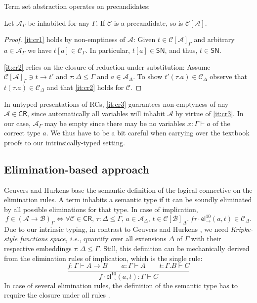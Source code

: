 \documentclass[a4paper,USenglish,cleveref, autoref, thm-restate]{lipics-v2019}
\newcommand{\ie}{\emph{i.e.}\xspace}
\newcommand{\ru}{\dfrac}
\newcommand{\tel}{\mathsf{el}}
\newcommand{\el}[2]{\ensuremath{\tel_{#1}^{#2}}}
\newcommand{\red}[1][]{\longrightarrow_{#1}}
\newcommand{\CR}{\mathsf{CR}}
\newcommand{\A}{\mathcal{A}}
\newcommand{\B}{\mathcal{B}}
\newcommand{\C}{\mathcal{C}}
\newcommand{\SN}{\mathsf{SN}}
\begin{document}
Term set abstraction operates on precandidates:
\begin{lemma}[Abstraction]
\label{lem:abs}
  Let $\A_\Gamma$ be inhabited for any $\Gamma$.
  If $\C$ is a precandidate, so is $\C[\A]$.
\end{lemma}
\begin{proof}
  \ref{it:cr1} holds by non-emptiness of $\A$:
  Given $t \in \C[\A]_\Gamma$ and
  arbitrary $a \in \A_\Gamma$ we have $t[a] \in \C_\Gamma$.  In
  particular, $t[a] \in \SN$, and thus, $t \in \SN$.

  \ref{it:cr2} relies on the closure of reduction
  under substitution:  Assume $\C[\A]_\Gamma \ni t \red t'$ and $\tau
  : \Delta \leq \Gamma$ and $a \in \A_\Delta$.  To show $t'(\tau.a)
  \in \C_\Delta$ observe that $t(\tau.a) \in \C_\Delta$ and that \ref{it:cr2}
  holds for $\C$.
\end{proof}

\begin{remark}
  In untyped presentations of RCs, \ref{it:cr3} guarantees
  non-emptyness of any $\A \in \CR$, since automatically all variables
  will inhabit $\A$ by virtue of \ref{it:cr3}.  In our case, $\A_\Gamma$
  may be empty since there may be no variables $x : \Gamma \vdash a$
  of the correct type $a$.  We thus have to be a bit careful when
  carrying over the textbook proofs
  \cite{girardLafontTaylor:proofsAndTypes}
  to our intrinsically-typed setting.
\end{remark}


\subsection{Elimination-based approach}
\label{sec:elimbased}

Geuvers and Hurkens \cite{geuversHurkens:types17} base the semantic
definition of the logical connective on the elimination rules.
A term inhabits a semantic type if it can be soundly eliminated by all
possible eliminations for that type.
In case of implication, %
\[
  f \in (\A \to \B)_\Gamma
  \iff
  \forall \C \in \CR, \,
  \tau : \Delta \leq \Gamma, \,
  a \in \A_\Delta, \,
  t \in \C[\B]_\Delta.\
  f\tau \cdot \el\to{10}(a,t) \in \C_\Delta .
\]
Due to our intrinsic typing,
in contrast to Geuvers and Hurkens \cite{geuversHurkens:types17},
we need \emph{Kripke-style functions space}, \ie,
quantify over all extensions $\Delta$ of $\Gamma$ with
their respective embeddings $\tau : \Delta \leq \Gamma$.
Still, this definition can be mechanically derived from the elimination rules
of implication, which is the single rule:
\[
  \ru{f : \Gamma \vdash A \to B \qquad
      a : \Gamma \vdash A \qquad
      t : \Gamma.B \vdash C
    }{f \cdot \el\to{10}(a,t) : \Gamma \vdash C
    }
\]
In case of several elimination rules, the definition of the semantic
type has to require the closure under all rules \cite{geuversHurkens:types17}.
\end{document}
